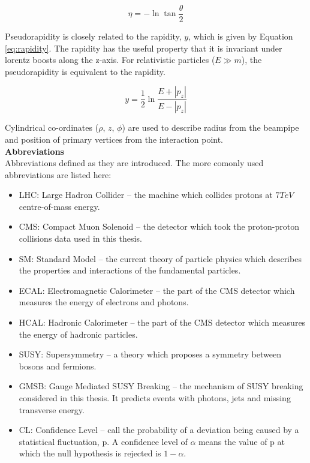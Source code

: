 \begin{equation}
\eta = -\ln\tan\frac{\theta}{2}
\label{eq:pseudorapidity}
\end{equation}

Pseudorapidity is closely related to the rapidity, $y$, which is given by
Equation \ref{eq:rapidity}. The rapidity has the useful property that it is
invariant under lorentz boosts along the z-axis. For relativistic particles ($E 
\gg m$), the pseudorapidity is equivalent to the rapidity.

\begin{equation}
y = \frac{1}{2}\ln\frac{E + |p_{z}|}{E - |p_{z}|}
\label{eq:rapidity}
\end{equation}

Cylindrical co-ordinates ($\rho$, $z$, $\phi$) are used to describe radius from 
the beampipe and position of primary vertices from the interaction point. \\

{\bf Abbreviations} \\

Abbreviations defined as they are introduced. The more comonly used
abbreviations are listed here:

\begin{itemize}
\item LHC: Large Hadron Collider -- the machine which collides protons at
$7\unit{TeV}$ centre-of-mass energy.
\item CMS: Compact Muon Solenoid -- the detector which took the proton-proton
collisions data used in this thesis.
\item SM: Standard Model -- the current theory of particle physics which
describes the properties and interactions of the fundamental particles.
\item ECAL: Electromagnetic Calorimeter -- the part of the CMS detector which 
measures the energy of electrons and photons.
\item HCAL: Hadronic Calorimeter -- the part of the CMS detector which measures
the energy of hadronic particles.
\item SUSY: Supersymmetry -- a theory which proposes a symmetry between bosons
and fermions. 
\item GMSB: Gauge Mediated SUSY Breaking -- the mechanism of SUSY breaking
considered in this thesis. It predicts events with photons, jets and missing
transverse energy.
\item CL: Confidence Level -- call the probability of a deviation being caused
by a statistical fluctuation, p. A confidence level of $\alpha$ means the value 
of p at which the null hypothesis is rejected is $1-\alpha$.
\end{itemize}

